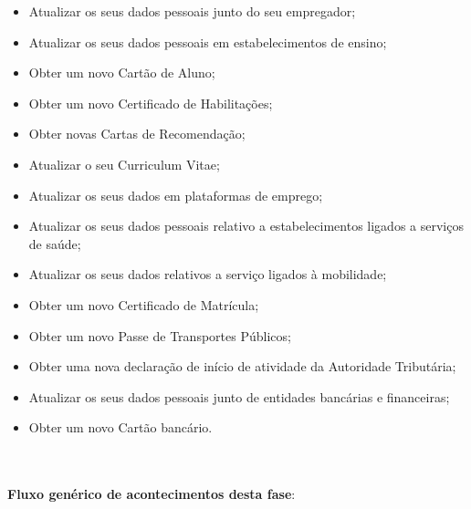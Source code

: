 \begin{itemize}
	\item Atualizar os seus dados pessoais junto do seu empregador;
	\item Atualizar os seus dados pessoais em estabelecimentos de ensino;
	\item Obter um novo Cartão de Aluno;
	\item Obter um novo Certificado de Habilitações;
	\item Obter novas Cartas de Recomendação;
	\item Atualizar o seu Curriculum Vitae;
	\item Atualizar os seus dados em plataformas de emprego;
	\item Atualizar os seus dados pessoais relativo a estabelecimentos ligados a serviços de saúde;
	\item Atualizar os seus dados relativos a serviço ligados à mobilidade;
	\item Obter um novo Certificado de Matrícula;
	\item Obter um novo Passe de Transportes Públicos;
	\item Obter uma nova declaração de início de atividade da Autoridade Tributária;
	\item Atualizar os seus dados pessoais junto de entidades bancárias e financeiras;
	\item Obter um novo Cartão bancário.
\end{itemize}
\leavevmode\\
\newpage
\leavevmode\\
\textbf{Fluxo genérico de acontecimentos desta fase}:
